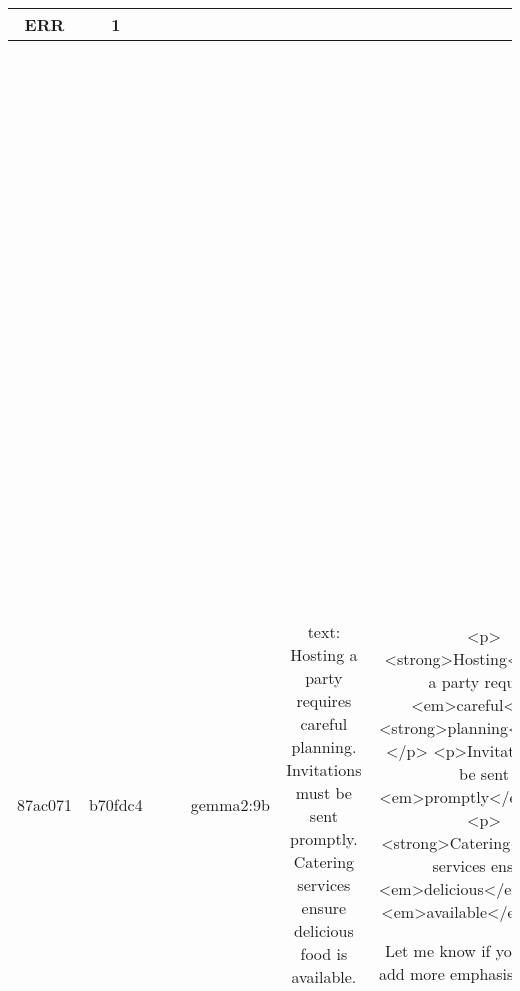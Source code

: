 \begin{table}[h!]
\begin{tabular}{|c|c|c|c|c|c|c|c|c|c|}
ERR & 1\\
\hline
87ac071 & b70fdc4 &  &  & gemma2:9b & text: Hosting a party requires careful planning. Invitations must be sent promptly. Catering services ensure delicious food is available. & <p><strong>Hosting</strong> a party requires <em>careful</em> <strong>planning</strong>.</p>
<p>Invitations must be sent <em>promptly</em>.</p> 
<p><strong>Catering</strong> services ensure <em>delicious</em> food is <em>available</em>.</p> 


Let me know if you'd like to add more emphasis or styling! & ok & The output has been carefully evaluated with respect to the given description:

1. **At Least Three <p> Tags**: The output contains three <p> tags, which meets the requirement stated in the description.

2. **Use of <strong> and <em> Tags**: The output includes the use of <strong> tags as well as multiple <em> tags, thereby complying with the requirement to emphasize key words and phrases within each <p> tag.

Since there are no violations observed based on the description provided, the output complies with the chatbot's description without the need of knowing the input.

No violation.
OK & 1\\
\hline
cdc8d2d & b70fdc4 &  &  & gemma2:9b & text: Learning a new language has many benefits. Bilingual individuals have better brain function. Language apps provide convenient practice. & Here's the HTML code:

<p><strong>Learning</strong> a new language has many <em>benefits</em>.</p> 
<p><strong>Bilingual</strong> individuals have better <em>brain</em> <em>function</em>.</p> 
<p><strong>Language</strong> apps provide <em>convenient</em> <em>practice</em>.</p>  



Let me know if you'd like to explore other formatting options or want to see how this code looks displayed in a browser! & ok & The evaluation of the chatbot output checks for compliance with the given description. The description requires that:

1. Each sentence should be wrapped with a `<p>` tag.
2. Each `<p>` tag should contain at least one `<strong>` tag.
3. Each `<p>` tag should contain multiple `<em>` tags.
4. The output should consist of at least three `<p>` tags.

The chatbot output contains:
- Three `<p>` tags: This complies with the requirement of having at least three `<p>` tags.
- Each `<p>` tag contains one `<strong>` tag, satisfying the requirement for including at least one `<strong>` tag per sentence.
- Each `<p>` tag contains two `<em>` tags, meeting the requirement of multiple `<em>` tags per sentence.


\end{tabular}
\end{table}
